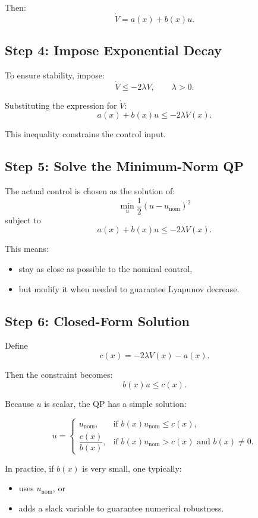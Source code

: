 \documentclass[11pt,a4paper]{article}
\begin{document}
Then:
\[
\dot V = a(x) + b(x)u.
\]

\subsection{Step 4: Impose Exponential Decay}

To ensure stability, impose:
\[
\dot V \le -2\lambda V,
\qquad \lambda > 0.
\]

Substituting the expression for \(\dot V\):
\[
a(x)+b(x)u \le -2\lambda V(x).
\]

This inequality constrains the control input.

\subsection{Step 5: Solve the Minimum-Norm QP}

The actual control is chosen as the solution of:
\[
\min_u \frac{1}{2}(u-u_{\mathrm{nom}})^2
\]
subject to
\[
a(x)+b(x)u \le -2\lambda V(x).
\]

This means:
\begin{itemize}[leftmargin=2em]
    \item stay as close as possible to the nominal control,
    \item but modify it when needed to guarantee Lyapunov decrease.
\end{itemize}

\subsection{Step 6: Closed-Form Solution}

Define
\[
c(x) = -2\lambda V(x) - a(x).
\]

Then the constraint becomes:
\[
b(x)u \le c(x).
\]

Because \(u\) is scalar, the QP has a simple solution:

\[
u =
\begin{cases}
u_{\mathrm{nom}}, & \text{if } b(x)u_{\mathrm{nom}} \le c(x), \\[1.2ex]
\dfrac{c(x)}{b(x)}, & \text{if } b(x)u_{\mathrm{nom}} > c(x)\text{ and } b(x)\neq 0.
\end{cases}
\]

In practice, if \(b(x)\) is very small, one typically:
\begin{itemize}[leftmargin=2em]
    \item uses \(u_{\mathrm{nom}}\), or
    \item adds a slack variable to guarantee numerical robustness.
\end{itemize}
\end{document}
